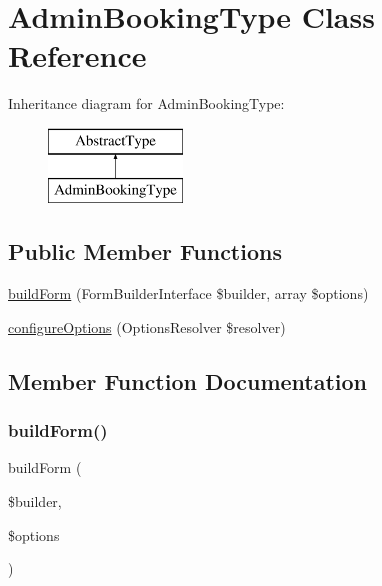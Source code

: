 \hypertarget{class_app_1_1_form_1_1_admin_booking_type}{}\section{Admin\+Booking\+Type Class Reference}
\label{class_app_1_1_form_1_1_admin_booking_type}
Inheritance diagram for Admin\+Booking\+Type\+:\begin{figure}[H]
\begin{center}
\leavevmode
\includegraphics[height=2.000000cm]{class_app_1_1_form_1_1_admin_booking_type}
\end{center}
\end{figure}
\subsection*{Public Member Functions}
\begin{DoxyCompactItemize}
\item 
\mbox{\hyperlink{class_app_1_1_form_1_1_admin_booking_type_a83c3745710374f9c5a1eb0686fe2dfab}{build\+Form}} (Form\+Builder\+Interface \$builder, array \$options)
\item 
\mbox{\hyperlink{class_app_1_1_form_1_1_admin_booking_type_a8ff68a86f5090b5df973286836e46ead}{configure\+Options}} (Options\+Resolver \$resolver)
\end{DoxyCompactItemize}


\subsection{Member Function Documentation}
\mbox{\label{class_app_1_1_form_1_1_admin_booking_type_a83c3745710374f9c5a1eb0686fe2dfab}} 
\subsubsection{\texorpdfstring{buildForm()}{buildForm()}}
{\footnotesize\ttfamily build\+Form (\begin{DoxyParamCaption}\item[{Form\+Builder\+Interface}]{\$builder,  }\item[{array}]{\$options }\end{DoxyParamCaption})}

